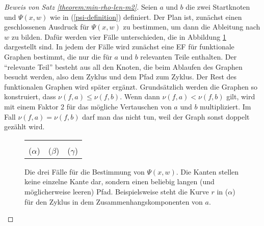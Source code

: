 \documentclass[a4paper, 10pt, ngerman]{article}
\begin{document}
    \begin{proof}[Beweis von Satz \ref{theorem:min-rho-len-m2}]
        Seien $a$ und $b$ die zwei Startknoten und $\Psi(x, w)$ wie in (\ref{psi-definition}) definiert. Der Plan ist, zunächst einen geschlossenen Ausdruck für $\Psi(x, w)$ zu bestimmen, um dann die Ableitung nach $w$ zu bilden. Dafür werden vier Fälle unterschieden, die in Abbildung \ref{fig:psi-construction} dargestellt sind. In jedem der Fälle wird zunächst eine EF für funktionale Graphen bestimmt, die nur die für $a$ und $b$ relevanten Teile enthalten. Der "`relevante Teil"' besteht aus all den Knoten, die beim Ablaufen des Graphen besucht werden, also dem Zyklus und dem Pfad zum Zyklus. Der Rest des funktionalen Graphen wird später ergänzt. Grundsätzlich werden die Graphen so konstruiert, dass $\nu(f, a) \le \nu(f, b)$. Wenn dann $\nu(f, a) < \nu(f, b)$ gilt, wird mit einem Faktor 2 für das mögliche Vertauschen von $a$ und $b$ multipliziert. Im Fall $\nu(f, a) = \nu(f, b)$ darf man das nicht tun, weil der Graph sonst doppelt gezählt wird.


        \begin{figure}
        \end{figure}

        \begin{figure}
            \begin{tabular}{ccc}
                 &  &  \\
                ($\alpha$)                           & ($\beta$)                           & ($\gamma$)
            \end{tabular}
            \caption{Die drei Fälle für die Bestimmung von $\Psi(x, w)$. Die Kanten stellen keine einzelne Kante dar, sondern einen beliebig langen (und möglicherweise leeren) Pfad. Beispielsweise steht die Kurve $r$ in ($\alpha$) für den Zyklus in dem Zusammenhangskomponenten von $a$.}
            \label{fig:psi-construction}
        \end{figure}


\end{proof}
\end{document}
